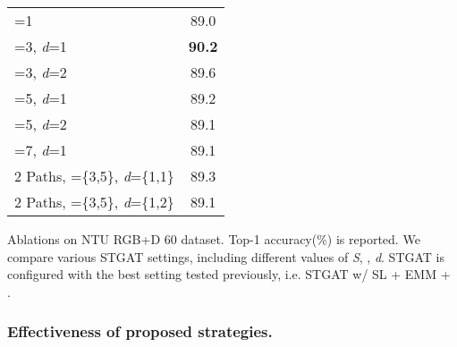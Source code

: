 \documentclass[runningheads]{llncs}
\begin{document}
\begin{minipage}{\textwidth}
\begin{minipage}[t]{0.46\textwidth}
\begin{tabular}[t]{l|c}
\hline
          =1      &   89.0  \\
          =3, \textit{d}=1 & \textbf{90.2}\\ 
          =3, \textit{d}=2 & 89.6   \\ 
          =5, \textit{d}=1 & 89.2\\ 
          =5, \textit{d}=2 & 89.1\\
          =7, \textit{d}=1 & 89.1\\
          2 Paths, =\{3,5\}, \textit{d}=\{1,1\} & 89.3\\
          2 Paths, =\{3,5\}, \textit{d}=\{1,2\} & 89.1\\
          \hline    
          \end{tabular}
\caption{Ablations on NTU RGB+D 60 dataset. Top-1 accuracy(\%) is reported. We compare various STGAT settings, including different values of \textit{S}, , \textit{d}. STGAT is configured with the best setting tested previously, i.e. STGAT w/ SL + EMM + . }
          \label{table2} 
    \end{minipage}
    \end{minipage}  
\subsubsection{Effectiveness of proposed strategies.}
\end{document}
